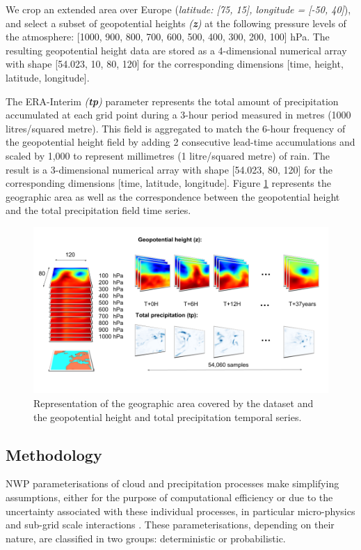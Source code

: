 \documentclass[twocol]{ametsoc}
\begin{document}
We crop an extended area over Europe (\textit{latitude: [75, 15], longitude = [-50, 40]}), and select a subset of geopotential heights \textit{(\textbf{z})} at the following pressure levels of the atmosphere: [1000, 900, 800, 700, 600, 500, 400, 300, 200, 100] hPa. The resulting geopotential height data are stored as a 4-dimensional numerical array with shape [54.023, 10, 80, 120] for the corresponding dimensions [time, height, latitude, longitude]. 

The ERA-Interim \textit{(\textbf{tp})} parameter represents the total amount of precipitation accumulated at each grid point during a 3-hour period measured in metres (1000 litres/squared metre). This field is aggregated to match the 6-hour frequency of the geopotential height field by adding 2 consecutive lead-time accumulations and scaled by 1,000 to represent millimetres (1 litre/squared metre) of rain. The result is a 3-dimensional numerical array with shape [54.023, 80, 120] for the corresponding dimensions [time, latitude, longitude]. Figure \ref{dataset} represents the geographic area as well as the correspondence between the geopotential height and the total precipitation field time series. 

\begin{figure}[h]
 \centerline{\includegraphics[width=13cm]{dataset.png}}
  \caption{Representation of the geographic area covered by the dataset and the geopotential height and total precipitation temporal series.}\label{dataset}
\end{figure}

\subsection{Methodology}

NWP parameterisations of cloud and precipitation processes make simplifying assumptions, either for the purpose of computational efficiency or due to the uncertainty associated with these individual processes, in particular micro-physics and sub-grid scale interactions \citep{lopez2007cloud}. These parameterisations, depending on their nature, are classified in two groups: deterministic or probabilistic. 
\end{document}
